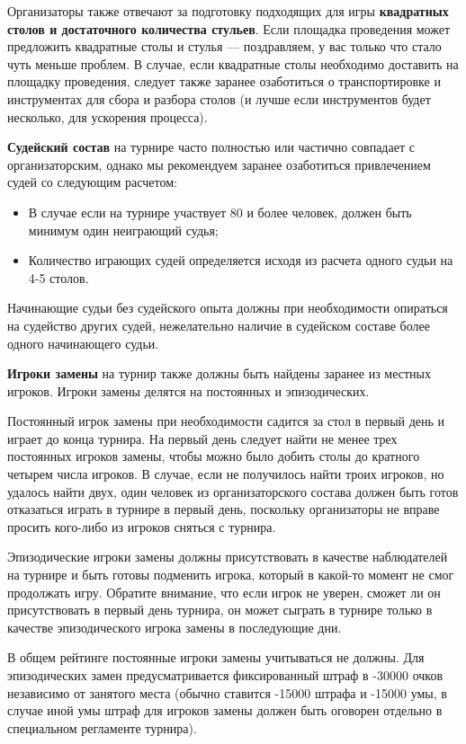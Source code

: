 Организаторы также отвечают за подготовку подходящих для игры \textbf{квадратных столов и достаточного количества стульев}. Если площадка проведения может предложить квадратные столы и стулья --- поздравляем, у вас только что стало чуть меньше проблем. В случае, если квадратные столы необходимо доставить на площадку проведения, следует также заранее озаботиться о транспортировке и инструментах для сбора и разбора столов (и лучше если инструментов будет несколько, для ускорения процесса).

\textbf{Судейский состав} на турнире часто полностью или частично совпадает с организаторским, однако мы рекомендуем заранее озаботиться привлечением судей со следующим расчетом:
\begin{itemize}
	\item В случае если на турнире участвует 80 и более человек, должен быть минимум один неиграющий судья;
	\item Количество играющих судей определяется исходя из расчета одного судьи на 4-5 столов.
\end{itemize}

Начинающие судьи без судейского опыта должны при необходимости опираться на судейство других судей, нежелательно наличие в судейском составе более одного начинающего судьи.

\textbf{Игроки замены} на турнир также должны быть найдены заранее из местных игроков. Игроки замены делятся на постоянных и эпизодических. 

Постоянный игрок замены при необходимости садится за стол в первый день и играет до конца турнира. На первый день следует найти не менее трех постоянных игроков замены, чтобы можно было добить столы до кратного четырем числа игроков. В случае, если не получилось найти троих игроков, но удалось найти двух, один человек из организаторского состава должен быть готов отказаться играть в турнире в первый день, поскольку организаторы не вправе просить кого-либо из игроков сняться с турнира.

Эпизодические игроки замены должны присутствовать в качестве наблюдателей на турнире и быть готовы подменить игрока, который в какой-то момент не смог продолжать игру. Обратите внимание, что если игрок не уверен, сможет ли он присутствовать в первый день турнира, он может сыграть в турнире только в качестве эпизодического игрока замены в последующие дни. 

В общем рейтинге постоянные игроки замены учитываться не должны. Для эпизодических замен предусматривается фиксированный штраф в -30000 очков независимо от занятого места (обычно ставится -15000 штрафа и -15000 умы, в случае иной умы штраф для игроков замены должен быть оговорен отдельно в специальном регламенте турнира).

